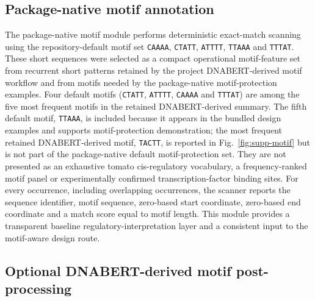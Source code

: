 \documentclass[10pt]{article}
\begin{document}
\subsection{Package-native motif annotation}

The package-native motif module performs deterministic exact-match scanning using the repository-default motif set \texttt{CAAAA}, \texttt{CTATT}, \texttt{ATTTT}, \texttt{TTAAA} and \texttt{TTTAT}. These short sequences were selected as a compact operational motif-feature set from recurrent short patterns retained by the project DNABERT-derived motif workflow and from motifs needed by the package-native motif-protection examples. Four default motifs (\texttt{CTATT}, \texttt{ATTTT}, \texttt{CAAAA} and \texttt{TTTAT}) are among the five most frequent motifs in the retained DNABERT-derived summary. The fifth default motif, \texttt{TTAAA}, is included because it appears in the bundled design examples and supports motif-protection demonstration; the most frequent retained DNABERT-derived motif, \texttt{TACTT}, is reported in Fig.~\ref{fig:supp-motif} but is not part of the package-native default motif-protection set. They are not presented as an exhaustive tomato cis-regulatory vocabulary, a frequency-ranked motif panel or experimentally confirmed transcription-factor binding sites. For every occurrence, including overlapping occurrences, the scanner reports the sequence identifier, motif sequence, zero-based start coordinate, zero-based end coordinate and a match score equal to motif length. This module provides a transparent baseline regulatory-interpretation layer and a consistent input to the motif-aware design route.

\subsection{Optional DNABERT-derived motif post-processing}
\end{document}

